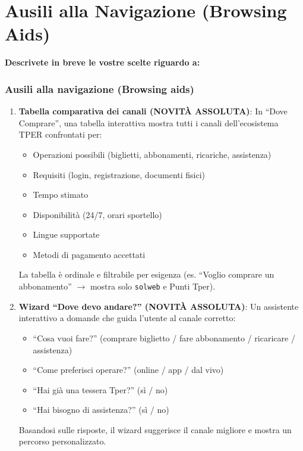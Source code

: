 \section{Ausili alla Navigazione (Browsing Aids)}

\begin{tcolorbox}[colback=primaryColor!10,colframe=primaryColor,arc=2mm]
\large\textbf{Descrivete in breve le vostre scelte riguardo a:}
\end{tcolorbox}

\vspace{0.3cm}

\begin{tcolorbox}[colback=backgroundColor,colframe=borderColor,arc=2mm]
{\small

\subsubsection{Ausili alla navigazione (Browsing aids)}

\begin{enumerate}[leftmargin=*]

 \item \textbf{Tabella comparativa dei canali (NOVITÀ ASSOLUTA)}: In ``Dove Comprare'', una tabella interattiva mostra tutti i canali dell'ecosistema TPER confrontati per:
 \begin{itemize}
   \item Operazioni possibili (biglietti, abbonamenti, ricariche, assistenza)
   \item Requisiti (login, registrazione, documenti fisici)
   \item Tempo stimato
   \item Disponibilità (24/7, orari sportello)
   \item Lingue supportate
   \item Metodi di pagamento accettati
 \end{itemize}
 La tabella è ordinale e filtrabile per esigenza (es. ``Voglio comprare un abbonamento'' $\rightarrow$ mostra solo \texttt{solweb} e Punti Tper).

 \item \textbf{Wizard ``Dove devo andare?'' (NOVITÀ ASSOLUTA)}: Un assistente interattivo a domande che guida l'utente al canale corretto:
 \begin{itemize}
   \item ``Cosa vuoi fare?'' (comprare biglietto / fare abbonamento / ricaricare / assistenza)
   \item ``Come preferisci operare?'' (online / app / dal vivo)
   \item ``Hai già una tessera Tper?'' (sì / no)
   \item ``Hai bisogno di assistenza?'' (sì / no)
 \end{itemize}
 Basandosi sulle risposte, il wizard suggerisce il canale migliore e mostra un percorso personalizzato.


\end{enumerate}}
\end{tcolorbox}
